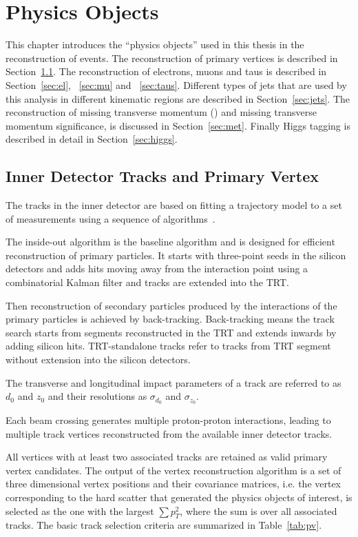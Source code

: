\chapter{Physics Objects}

\label{ch:objects}

\par This chapter introduces the ``physics objects'' used in this thesis in the reconstruction of events. The reconstruction of primary vertices is described in Section~\ref{sec:pv}. 
The reconstruction of electrons, muons and taus is described in Section~\ref{sec:el}, ~\ref{sec:mu} and ~\ref{sec:taus}.
Different types of jets that are used by this analysis in different kinematic regions are described in Section~\ref{sec:jets}. 
The reconstruction of missing transverse momentum (\met) and missing transverse momentum significance, is discussed in Section~\ref{sec:met}. 
Finally Higgs tagging is described in detail in Section~\ref{sec:higgs}.

\section{Inner Detector Tracks and Primary Vertex}
\label{sec:pv}

\par The tracks in the inner detector are based on fitting a trajectory model to a set of measurements using a sequence of algorithms~\cite{Cornelissen:1020106}.
\par The inside-out algorithm is the baseline algorithm and is designed for efficient reconstruction of primary particles. 
It starts with three-point seeds in the silicon detectors and adds hits moving away from the interaction point using a combinatorial Kalman filter 
and tracks are extended into the TRT.
\par Then reconstruction of secondary particles produced by the interactions of the primary particles is achieved by back-tracking. 
Back-tracking means the track search starts from segments reconstructed in the TRT and extends inwards by adding silicon hits. 
TRT-standalone tracks refer to tracks from TRT segment without extension into the silicon detectors.					
\par The transverse and longitudinal impact parameters of a track are referred to as $d_0$ and $z_0$ and their resolutions as $\sigma_{d_0}$ 
and $\sigma_{z_0}$. 
\par Each beam crossing generates multiple proton-proton interactions, leading to multiple track vertices reconstructed from the available inner detector tracks.
\par All vertices with at least two associated tracks are retained as valid primary vertex candidates. 
The output of the vertex reconstruction algorithm is a set of three dimensional vertex positions and their covariance matrices, i.e. the vertex corresponding to the hard scatter that generated the physics objects of interest, is selected as the one with the largest $\sum p_T^2$, where the sum is over all associated tracks. 
The basic track selection criteria are summarized in Table~\ref{tab:pv}.

